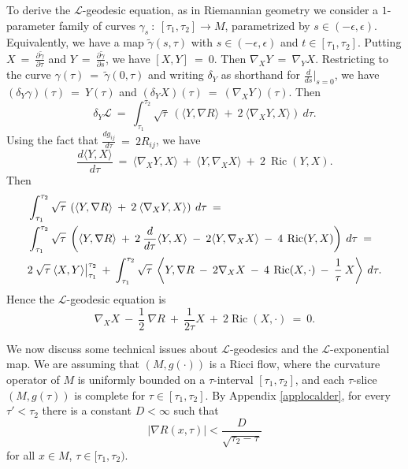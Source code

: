 \documentclass[12pt]{amsart}
\newcommand{\Ric}{\operatorname{Ric}}
\numberwithin{equation}{section}
\theoremstyle{plain}
\theoremstyle{definition}
\theoremstyle{remark}
\begin{document}
To derive the ${\mathcal L}$-geodesic equation, as in Riemannian geometry
we consider a
$1$-parameter family of curves 
$\gamma_s \: : \: [\tau_1, \tau_2] \rightarrow
M$, parametrized by $s \in (-\epsilon, \epsilon)$. Equivalently, we
have a map $\tilde\gamma(s, \tau)$ with $s \in (-\epsilon, \epsilon)$ and
$t \in [\tau_1, \tau_2]$. Putting $X \: = \: 
\frac{\partial \tilde\gamma}{\partial \tau}$ and 
$Y \: = \: 
\frac{\partial \tilde\gamma}{\partial s}$, we have
$[X, Y] \: = \: 0$. Then $\nabla_X Y \: = \: \nabla_Y X$.
Restricting to the curve $\gamma(\tau) \: = \: \tilde\gamma(0, \tau)$ and
writing $\delta_Y$ as shorthand for $\frac{d}{ds} \big|_{s=0}$, we
have $(\delta_Y \gamma)(\tau) \:  =\: Y(\tau)$ and $(\delta_Y X)(\tau) \: = \: 
(\nabla_X Y)(\tau)$.
Then
\begin{equation}
\delta_Y {\mathcal L} \: = \:
\int_{\tau_1}^{\tau_2} \sqrt{\tau} \: \left( \langle Y, \nabla R \rangle
\: + \: 2 \: \langle \nabla_X Y, X \rangle \right) \: d\tau.
\end{equation}
Using the fact that $\frac{dg_{ij}}{d\tau} \: = \: 2 R_{ij}$, we have
\begin{equation}
\frac{d\langle Y, X \rangle}{d\tau} \: = \:
\langle \nabla_X Y, X \rangle \: + \: 
\langle Y, \nabla_X X \rangle \: + \: 
2 \: \Ric(Y, X).
\end{equation}
Then
\begin{align}
\label{firstvariation}
& \int_{\tau_1}^{\tau_2} \sqrt{\tau} \: \left( \langle Y, \nabla R \rangle
\: + \: 2 \: \langle \nabla_X Y, X \rangle \right) \: d\tau \: = \\
& \int_{\tau_1}^{\tau_2} \sqrt{\tau} \: \left( \langle Y, \nabla R \rangle
\: + \: 2 \: \frac{d}{d\tau} \langle Y, X \rangle \: - \: 2
\langle Y, \nabla_X X \rangle \: - \: 4 \: \Ric(Y, X) 
 \right) \: d\tau \: = \notag \\
& 2 \: \sqrt{{\tau}} \: \langle X, Y \rangle \big|_{\tau_1}^{\tau_2}
\: + \: 
\int_{\tau_1}^{\tau_2} \sqrt{\tau} \: \left\langle Y, \nabla R
\: - \: 2 \nabla_X X  \: - \: 4 \: \Ric(X, \cdot) \: -\: \frac{1}{\tau}
\: X \right\rangle 
 \: d\tau. \notag
\end{align}
Hence the ${\mathcal L}$-geodesic equation is
\begin{equation} \label{Lgeod}
\nabla_X X \: - \: \frac12 \: \nabla R \: + \: \frac{1}{2\tau} X \: + \:
2 \Ric(X, \cdot) \: = \: 0.
\end{equation}

We now discuss some technical issues about ${\mathcal L}$-geodesics and
the ${\mathcal L}$-exponential map.
We are assuming that $(M,g(\cdot))$ is a Ricci flow, where the curvature 
operator
of $M$ is uniformly bounded on a $\tau$-interval $[\tau_1,\tau_2]$, and
each $\tau$-slice $(M,g(\tau))$ is complete for $\tau\in [\tau_1,\tau_2]$.
By Appendix \ref{applocalder},  for every $\tau'<\tau_2$ there 
is a constant $D< \infty$ such that
\begin{equation}
\label{dr}
|\nabla R(x,\tau)|< \frac{D}{\sqrt{\tau_2 - \tau}}
\end{equation}
for all $x\in M$, $\tau \in [\tau_1, \tau_2)$.
\end{document}
